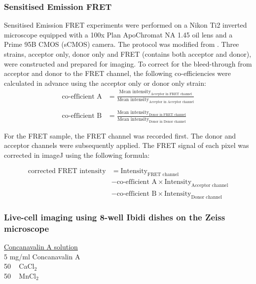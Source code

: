 \subsubsection{Sensitised Emission FRET}
Sensitised Emission FRET experiments were performed on a Nikon Ti2 inverted microscope equipped with a 100x Plan ApoChromat NA 1.45 oil lens and a Prime 95B CMOS (sCMOS) camera. The protocol was modified from \cite{Gordon1998QuantitativeMicroscopy}. Three strains, acceptor only, donor only and FRET (contains both acceptor and donor), were constructed and prepared for imaging. To correct for the bleed-through from acceptor and donor to the FRET channel, the following co-efficiencies were calculated in advance using the acceptor only or donor only strain:
\begin{align*}
    \text{co-efficient A}& =\frac{\text{Mean intensity}_\text{Acceptor in FRET channel}}{\text{Mean intensity}_\text{Acceptor in Acceptor channel}}\\
    &\\
    \text{co-efficient B}& =\frac{\text{Mean intensity}_\text{Donor in FRET channel}}{\text{Mean intensity}_\text{Donor in Donor channel}}
\end{align*}

For the FRET sample, the FRET channel was recorded first. The donor and acceptor channels were subsequently applied. The FRET signal of each pixel was corrected in imageJ using the following formula: 

\begin{align*}
    \text{corrected FRET intensity} &= \text{Intensity}_\text{FRET channel}\\& - \text{co-efficient A} \times \text{Intensity}_\text{Acceptor channel}\\& - \text{co-efficient B} \times \text{Intensity}_\text{Donor channel}
\end{align*}

\subsubsection{Live-cell imaging using 8-well Ibidi dishes on the Zeiss microscope}

\underline{Concanavalin A solution}\\
5 \si{\milli\gram/\milli\litre} Concanavalin A \\
50 \si{\milli\Molar} CaCl$_{2}$ \\
50 \si{\milli\Molar} MnCl$_{2}$ 

